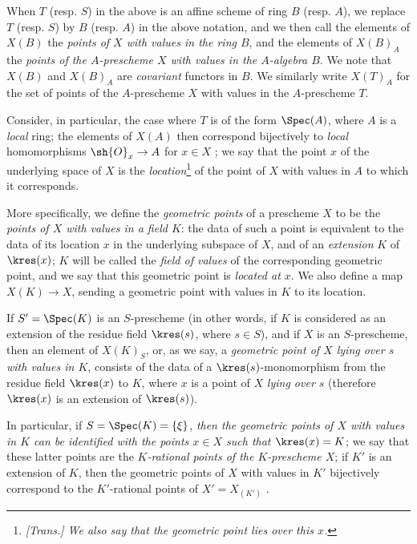 \begin{env}[3.4.4]
\label{I.3.4.4}
When $T$ (resp. $S$) in the above is an affine scheme of ring $B$ (resp. $A$), we replace
$T$ (resp. $S$) by $B$ (resp. $A$) in the above notation, and we then call the elements of
$X(B)$ the \emph{points of $X$ with values in the ring $B$}, and the elements of $X(B)_A$ the
\emph{points of the $A$-prescheme $X$ with values in the $A$-algebra $B$}. We note that
$X(B)$ and $X(B)_A$ are \emph{covariant} functors in $B$. We similarly write $X(T)_A$ for the
set of points of the $A$-prescheme $X$ with values in the $A$-prescheme $T$.
\end{env}

\begin{env}[3.4.5]
\label{I.3.4.5}
Consider, in particular, the case where $T$ is of the form $\Spec(A)$, where $A$ is a
\emph{local} ring; the elements of $X(A)$ then correspond bijectively to \emph{local}
homomorphisms $\sh{O}_x\to A$ for $x\in X$ ; we say that the
point $x$ of the underlying space of $X$ is the \emph{location}\footnote{\emph{[Trans.] We also say that
\emph{the geometric point lies over this $x$}.}} of the point of $X$ with values in $A$ to which it corresponds.

More specifically, we define the \emph{geometric points} of a prescheme $X$ to be the \emph{points of
$X$ with values in a field $K$}: the data of such a point is equivalent to the data of its
location $x$ in the underlying subspace of $X$, and of an \emph{extension} $K$ of $\kres(x)$;
$K$ will be called the \emph{field of values} of the corresponding geometric point, and we
say that this geometric point is \emph{located at $x$}. We also define a map $X(K)\to X$,
sending a geometric point with values in $K$ to its location.

If $S'=\Spec(K)$ is an $S$-prescheme (in other words, if $K$ is considered as an extension
of the residue field $\kres(s)$, where $s\in S$), and if $X$ is an $S$-prescheme, then an
element of $X(K)_S$, or, as we say, a \emph{geometric point of $X$ lying over $s$ with values
in $K$}, consists of the data of a $\kres(s)$-monomorphism from the residue field $\kres(x)$
to $K$, where $x$ is a point of $X$ \emph{lying over $s$} (therefore $\kres(x)$ is an
extension of $\kres(s)$).

In particular, if $S=\Spec(K)=\{\xi\}$, \emph{then the geometric points of $X$ with values in
$K$ can be identified with the points $x\in X$ such that $\kres(x)=K$}; we say that these latter
points are the \emph{$K$-rational points of the $K$-prescheme $X$}; if $K'$ is an extension
of $K$, then the geometric points of $X$ with values in $K'$ bijectively correspond to the
$K'$-rational points of $X'=X_{(K')}$ .
\end{env}

